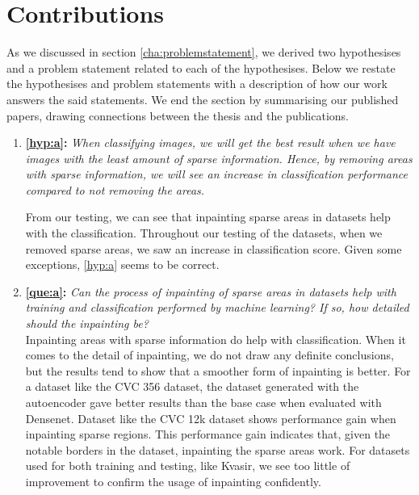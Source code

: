 \section{Contributions}
As we discussed in section \ref{cha:problemstatement}, we derived two hypothesises and a problem statement related to each of the hypothesises.
Below we restate the hypothesises and problem statements with a description of how our work answers the said statements.
We end the section by summarising our published papers, drawing connections between the thesis and the publications.\\
\clearpage
\begin{enumerate}

\item \textbf{\ref{hyp:a}:} \textit{When classifying images, we will get the best result when we have images with the least amount of sparse information. Hence, by removing areas with sparse information, we will see an increase in classification performance compared to not removing the areas.}

From our testing, we can see that inpainting sparse areas in datasets help with the classification. Throughout our testing of the datasets, when we removed sparse areas, we saw an increase in classification score. Given some exceptions, \ref{hyp:a} seems to be correct.
    


\item \textbf{\ref{que:a}:} \textit{ Can the process of inpainting of sparse areas in datasets help with training and classification performed by machine learning? If so, how detailed should the inpainting be?}\\ 
    
Inpainting areas with sparse information do help with classification. When it comes to the detail of inpainting, we do not draw any definite conclusions, but the results tend to show that a smoother form of inpainting is better.
For a dataset like the CVC 356 dataset, the dataset generated with the autoencoder gave better results than the base case when evaluated with Densenet.
Dataset like the CVC 12k dataset shows performance gain when inpainting sparse regions. This performance gain indicates that, given the notable borders in the dataset, inpainting the sparse areas work.
For datasets used for both training and testing, like Kvasir, we see too little of improvement to confirm the usage of inpainting confidently.
    



\end{enumerate}
